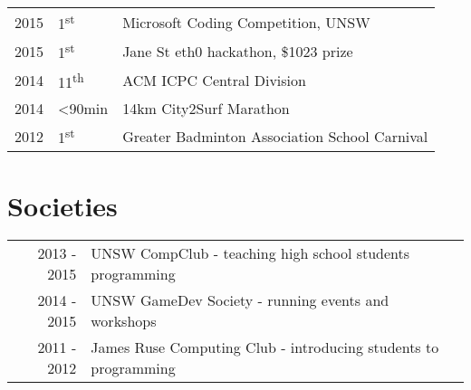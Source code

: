 \documentclass[letter]{deedy-resume} %
\begin{document}
\begin{minipage}[t]{0.66\textwidth}
\begin{tabular}{rll}
2015 & 1\textsuperscript{st} & Microsoft Coding Competition, UNSW \\
2015 & 1\textsuperscript{st} & Jane St eth0 hackathon, \$1023 prize \\
2014 & 11\textsuperscript{th} & ACM ICPC Central Division \\
2014 & <90min & 14km City2Surf Marathon \\
2012 & 1\textsuperscript{st} & Greater Badminton Association School Carnival \\
\end{tabular}

\sectionspace %


\section{Societies} 

\begin{tabular}{rll}
2013 - 2015 & UNSW CompClub - teaching high school students programming \\
2014 - 2015 & UNSW GameDev Society - running events and workshops \\
2011 - 2012 & James Ruse Computing Club - introducing students to programming \\
\end{tabular}

\sectionspace %


\end{minipage} %




\end{document}
